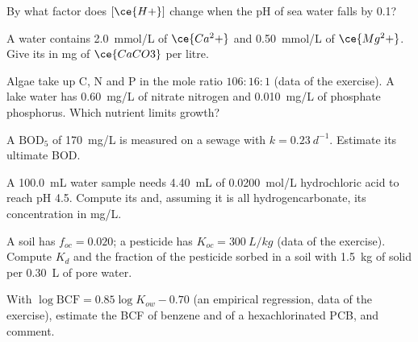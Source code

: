\begin{exercise}[$\star$]\label{exo:b3:environmental-toxicology:2}
By what factor does $[\ce{H+}]$ change when the pH of sea water falls by 0.1?
\end{exercise}

\begin{exercise}[$\star$]\label{exo:b3:environmental-toxicology:3}
A water contains \qty{2.0}{mmol/L} of $\ce{Ca^2+}$ and \qty{0.50}{mmol/L} of $\ce{Mg^2+}$. Give its  in mg of $\ce{CaCO3}$ per litre.
\end{exercise}

\begin{exercise}[$\star$]\label{exo:b3:environmental-toxicology:4}
Algae take up C, N and P in the mole ratio $106 : 16 : 1$ (data of the exercise). A lake water
has \qty{0.60}{mg/L} of nitrate nitrogen and \qty{0.010}{mg/L} of phosphate phosphorus. Which nutrient limits
growth?
\end{exercise}

\begin{exercise}[$\star\star$]\label{exo:b3:environmental-toxicology:5}
A $\mathrm{BOD_5}$ of \qty{170}{mg/L} is measured on a sewage with $k = \qty{0.23}{d^{-1}}$. Estimate its ultimate BOD.
\end{exercise}

\begin{exercise}[$\star\star$]\label{exo:b3:environmental-toxicology:6}
A \qty{100.0}{mL} water sample needs \qty{4.40}{mL} of \qty{0.0200}{mol/L} hydrochloric acid to reach pH 4.5. Compute its
 and, assuming it is all hydrogencarbonate, its concentration in mg/L.
\end{exercise}

\begin{exercise}[$\star\star$]\label{exo:b3:environmental-toxicology:7}
A soil has $f_{oc} = 0.020$; a pesticide has $K_{oc} = \qty{300}{L/kg}$ (data of the exercise). Compute $K_d$ and the
fraction of the pesticide sorbed in a soil with \qty{1.5}{kg} of solid per \qty{0.30}{L} of pore water.
\end{exercise}

\begin{exercise}[$\star\star$]\label{exo:b3:environmental-toxicology:8}
With $\log\mathrm{BCF} = 0.85\log K_{ow} - 0.70$ (an empirical regression, data of the exercise), estimate the BCF of
benzene and of a hexachlorinated PCB, and comment.
\end{exercise}

